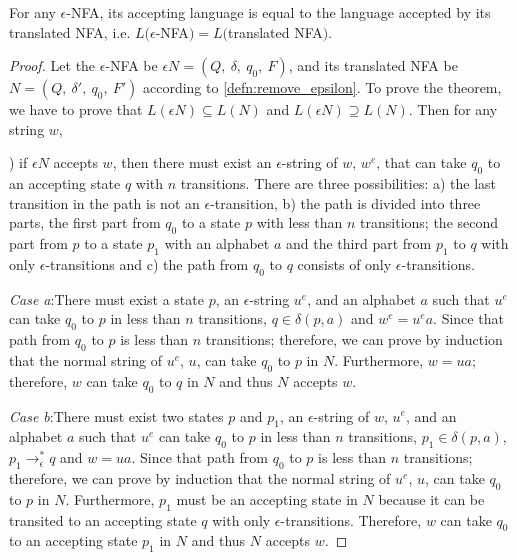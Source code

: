 \begin{thm}
\noindent For any \(\epsilon\)-NFA, its accepting language is equal to
the language accepted by its translated NFA, i.e. \(L(\epsilon\)-NFA\()
= L(\)translated NFA\()\). 
\end{thm}

\begin{proof}
\noindent Let the \(\epsilon\)-NFA be \(\epsilon N = (Q,\ \delta,\ q_0,\
F)\), and its translated NFA be \(N = (Q,\ \delta',\ q_0,\ F')\)
according to \autoref{defn:remove_epsilon}. To
prove the theorem, we have to prove that \(L(\epsilon N) \subseteq
L(N)\) and \(L(\epsilon N) \supseteq L(N)\). Then for any string \(w\), 

\par {}) if \(\epsilon N\) accepts \(w\), then there must exist an
\(\epsilon\)-string of \(w\), \(w^e\), that can take \(q_0\) to an
accepting state \(q\) with \(n\) transitions. There are three
possibilities: a) the last transition in the path is not an
\(\epsilon\)-transition, b) the path is divided into three parts, the
first part from \(q_0\) to a state \(p\) with less than \(n\)
transitions; the second part from \(p\) to a state \(p_1\) with an
alphabet \(a\) and the third part from \(p_1\) to \(q\) with only
\(\epsilon\)-transitions and c) the path from \(q_0\)
to \(q\) consists of only \(\epsilon\)-transitions.

\par \textit{Case a}:\quad There must exist a state \(p\), an
\(\epsilon\)-string \(u^e\), and an alphabet \(a\) such that \(u^e\)
can take \(q_0\) to \(p\) in less than \(n\) transitions, \(q \in
\delta(p,a)\) and \(w^e = u^ea\). Since that path from \(q_0\) to
\(p\) is less than \(n\) transitions; therefore, we can prove by
induction that the normal string of \(u^e\), \(u\), can take
\(q_0\) to \(p\) in \(N\). Furthermore, \(w = ua\); therefore, \(w\) can
take \(q_0\) to \(q\) in \(N\) and thus \(N\) accepts \(w\). 

\par \textit{Case b}:\quad There must exist two states \(p\) and \(p_1\), an
\(\epsilon\)-string of \(w\), \(u^e\), and an alphabet \(a\) such
that \(u^e\) can take \(q_0\) to \(p\) in less than \(n\) transitions,
\(p_1 \in \delta(p,a)\), \(p_1 \to_\epsilon^* q\) and \(w = ua\). Since that path from \(q_0\) to
\(p\) is less than \(n\) transitions; therefore, we can prove by
induction that the normal string of \(u^e\), \(u\), can take
\(q_0\) to \(p\) in \(N\). Furthermore, \(p_1\) must be an accepting state in \(N\)
because it can be transited to an accepting state \(q\) with only
\(\epsilon\)-transitions. Therefore, \(w\) can take \(q_0\) to an
accepting state \(p_1\) in \(N\) and thus \(N\) accepts \(w\). 


\end{proof}
